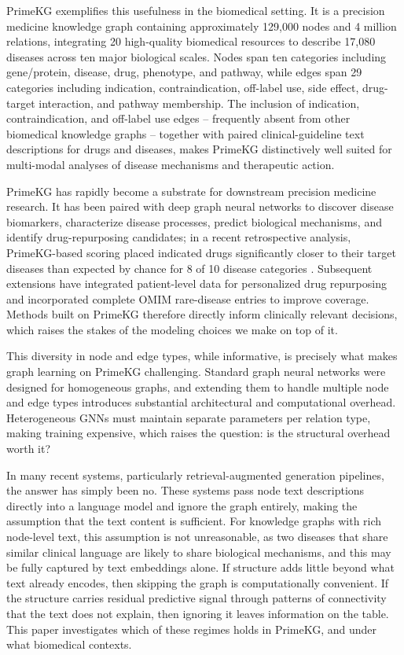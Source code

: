 \documentclass{article}
\theoremstyle{plain}
\theoremstyle{definition}
\theoremstyle{remark}
\begin{document}
PrimeKG \citep{primekg2023} exemplifies this usefulness in the biomedical setting. It is a precision medicine knowledge graph containing approximately 129{,}000 nodes and 4 million relations, integrating 20 high-quality biomedical resources to describe 17{,}080 diseases across ten major biological scales. Nodes span ten categories including gene/protein, disease, drug, phenotype, and pathway, while edges span 29 categories including indication, contraindication, off-label use, side effect, drug-target interaction, and pathway membership. The inclusion of indication, contraindication, and off-label use edges -- frequently absent from other biomedical knowledge graphs -- together with paired clinical-guideline text descriptions for drugs and diseases, makes PrimeKG distinctively well suited for multi-modal analyses of disease mechanisms and therapeutic action.

PrimeKG has rapidly become a substrate for downstream precision medicine research. It has been paired with deep graph neural networks to discover disease biomarkers, characterize disease processes, predict biological mechanisms, and identify drug-repurposing candidates; in a recent retrospective analysis, PrimeKG-based scoring placed indicated drugs significantly closer to their target diseases than expected by chance for 8 of 10 disease categories \citep{primekg2023}. Subsequent extensions have integrated patient-level data for personalized drug repurposing \citep{pdr2025} and incorporated complete OMIM rare-disease entries to improve coverage. Methods built on PrimeKG therefore directly inform clinically relevant decisions, which raises the stakes of the modeling choices we make on top of it.

This diversity in node and edge types, while informative, is precisely what makes graph learning on PrimeKG challenging. Standard graph neural networks were designed for homogeneous graphs, and extending them to handle multiple node and edge types introduces substantial architectural and computational overhead. Heterogeneous GNNs must maintain separate parameters per relation type, making training expensive, which raises the question: is the structural overhead worth it?

In many recent systems, particularly retrieval-augmented generation pipelines, the answer has simply been no. These systems pass node text descriptions directly into a language model and ignore the graph entirely, making the assumption that the text content is sufficient. For knowledge graphs with rich node-level text, this assumption is not unreasonable, as two diseases that share similar clinical language are likely to share biological mechanisms, and this may be fully captured by text embeddings alone. If structure adds little beyond what text already encodes, then skipping the graph is computationally convenient. If the structure carries residual predictive signal through patterns of connectivity that the text does not explain, then ignoring it leaves information on the table. This paper investigates which of these regimes holds in PrimeKG, and under what biomedical contexts.
\end{document}
